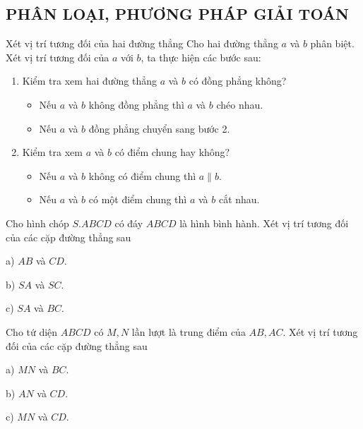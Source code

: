 \subsection{PHÂN LOẠI, PHƯƠNG PHÁP GIẢI TOÁN}
\begin{dang} {Xét vị trí tương đối của hai đường thẳng}
	Cho hai đường thẳng $a$ và $b$ phân biệt. Xét vị trí tương đối của $a$ với $b$, ta thực hiện các bước sau:
		\begin{enumerate}[\iconCV]
		\item {}  Kiểm tra xem hai đường thẳng $a$ và $b$ có đồng phẳng không?
		\begin{itemize}
			\item Nếu $a$ và $b$ không đồng phẳng thì $a$ và $b$ chéo nhau.
			\item Nếu $a$ và $b$ đồng phẳng chuyển sang bước 2.
		\end{itemize}
		\item {} Kiểm tra xem $a$ và $b$ có điểm chung hay không?
			\begin{itemize}
				\item Nếu $a$ và $b$ không có điểm chung thì $a\parallel b$.
				\item Nếu $a$ và $b$ có một điểm chung thì $a$ và $b$ cắt nhau.
			\end{itemize}
		\end{enumerate}
\end{dang}
\begin{vd}
	Cho hình chóp $S.ABCD$ có đáy $ABCD$ là hình bình hành. Xét vị trí tương đối của các cặp đường thẳng sau
	\begin{listEX}[3]
		\item [a)] $AB$ và $CD$.
		\item [b)] $SA$ và $SC$.
		\item [c)] $SA$ và $BC$.
	\end{listEX}
\end{vd}
\begin{vd}
	Cho tứ diện $ABCD$ có $M, N$ lần lượt là trung điểm của $AB, AC$. Xét vị trí tương đối của các cặp đường thẳng sau
	\begin{listEX}[3]
		\item [a)] $MN$ và $BC$.
		\item [b)] $AN$ và $CD$.
		\item [c)] $MN$ và $CD$.
	\end{listEX}
\end{vd}
